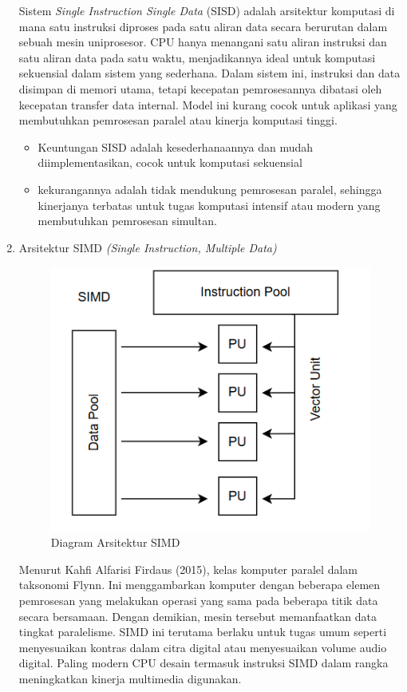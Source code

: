 \documentclass[12pt]{article}
\begin{document}
\begin{enumerate}
    Sistem \textit{Single Instruction Single Data} (SISD) adalah arsitektur komputasi di mana satu instruksi diproses pada satu aliran data secara berurutan dalam sebuah mesin uniprosesor. CPU hanya menangani satu aliran instruksi dan satu aliran data pada satu waktu, menjadikannya ideal untuk komputasi sekuensial dalam sistem yang sederhana. Dalam sistem ini, instruksi dan data disimpan di memori utama, tetapi kecepatan pemrosesannya dibatasi oleh kecepatan transfer data internal. Model ini kurang cocok untuk aplikasi yang membutuhkan pemrosesan paralel atau kinerja komputasi tinggi.

    \begin{itemize}
        \item  Keuntungan  SISD adalah kesederhanaannya dan mudah diimplementasikan, cocok untuk komputasi sekuensial
        \item kekurangannya adalah tidak mendukung pemrosesan paralel, sehingga kinerjanya terbatas untuk tugas komputasi intensif atau modern yang membutuhkan pemrosesan simultan.
    \end{itemize}
    
    \item Arsitektur SIMD \textit{(Single Instruction, Multiple Data)}

        \noindent
        \begin{figure}[H]
            \centering
            \includegraphics[width=0.4\linewidth]{asset/image7.png}
            \caption{Diagram Arsitektur SIMD}
            \label{fig:Diagram-Arsitektur-SIMD}
        \end{figure}
    
    Menurut Kahfi Alfarisi Firdaus (2015), kelas komputer paralel dalam taksonomi Flynn. Ini menggambarkan komputer dengan beberapa elemen pemrosesan yang melakukan operasi yang sama pada beberapa titik data secara bersamaan. Dengan demikian, mesin tersebut memanfaatkan data tingkat paralelisme. SIMD ini terutama berlaku untuk tugas umum seperti menyesuaikan kontras dalam citra digital atau menyesuaikan volume audio digital. Paling modern CPU desain termasuk instruksi SIMD dalam rangka meningkatkan kinerja multimedia digunakan.


\end{enumerate}
\end{document}
